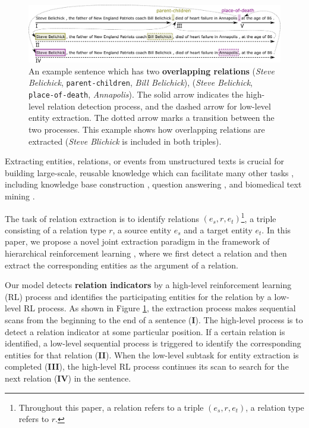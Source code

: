 \documentclass[letterpaper]{article}
\theoremstyle{definition}
\begin{document}
\begin{figure}[!tp]
    \centering
    \includegraphics[width=\linewidth]{example.png}
    \caption{An example sentence which has two {\bf overlapping relations} (\textit{Steve Belichick}, \texttt{parent-children}, \textit{Bill Belichick}), (\textit{Steve Belichick}, \texttt{place-of-death}, \textit{Annapolis}). The solid arrow indicates the high-level relation detection process, and the dashed arrow for low-level entity extraction. The dotted arrow marks a transition between the two processes. This example shows how overlapping relations are extracted (\textit{Steve Blichick} is included in both triples).}
    \label{Example}
\end{figure}

Extracting entities, relations, or events from unstructured texts is crucial for building large-scale, reusable knowledge which can facilitate many other tasks \cite{mintz2009distant,nadeau2007survey}, including knowledge base construction \cite{dong2014knowledge,luan2018multi}, question answering \cite{fader2014open}, and biomedical text mining \cite{huang2015community}.


The task of relation extraction is to identify relations $(e_s, r, e_t)$\footnote{Throughout this paper, a relation refers to a triple $(e_s, r, e_t)$, a relation type refers to $r$.}, a triple consisting of a relation type $r$, a source entity $e_s$ and a target entity $e_t$. In this paper, we propose a novel joint extraction paradigm in the framework of hierarchical reinforcement learning \cite{sutton1999between}, where we first detect a relation and then extract the corresponding entities as the argument of a relation.


Our model detects {\bf relation indicators} by a high-level reinforcement learning (RL) process and identifies the participating entities for the relation by a low-level RL process.
As shown in Figure \ref{Example},
the extraction process makes sequential scans from the beginning to the end of a sentence (\textbf{I}). The high-level process is to detect a relation indicator at some particular position.
If a certain relation is identified, a low-level sequential process is triggered to identify the corresponding entities for that relation (\textbf{II}).
When the low-level subtask for entity extraction is completed (\textbf{III}), the high-level RL process continues its scan to search for the next relation (\textbf{IV}) in the sentence.
\end{document}
